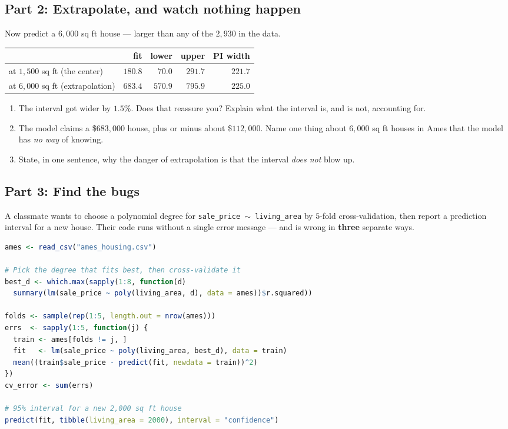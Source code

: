 \documentclass{article}
\begin{document}
\newpage

\subsection*{Part 2: Extrapolate, and watch nothing happen}

Now predict a $6{,}000$ sq ft house --- larger than any of the $2{,}930$ in the data.

\begin{center}
\renewcommand{\arraystretch}{1.3}
\begin{tabular}{lrrrr}
\toprule
& fit & lower & upper & PI width \\
\midrule
at $1{,}500$ sq ft (the center) & $180.8$ & $70.0$ & $291.7$ & $221.7$ \\
at $6{,}000$ sq ft (extrapolation) & $683.4$ & $570.9$ & $795.9$ & $225.0$ \\
\bottomrule
\end{tabular}
\end{center}

\begin{enumerate}[label={\bfseries (\Alph*)},itemsep=.8em]
\item The interval got wider by $1.5\%$. Does that reassure you? Explain what the interval is, and is not, accounting for. \\[4em]
\item The model claims a \$$683{,}000$ house, plus or minus about \$$112{,}000$. Name one thing about $6{,}000$ sq ft houses in Ames that the model has \emph{no way} of knowing. \\[3.5em]
\item State, in one sentence, why the danger of extrapolation is that the interval \emph{does not} blow up. \\[3.5em]
\end{enumerate}

\subsection*{Part 3: Find the bugs}

A classmate wants to choose a polynomial degree for \texttt{sale\_price $\sim$ living\_area} by $5$-fold cross-validation, then report a prediction interval for a new house. Their code runs without a single error message --- and is wrong in \textbf{three} separate ways.

\begin{lstlisting}[language=R]
ames <- read_csv("ames_housing.csv")

# Pick the degree that fits best, then cross-validate it
best_d <- which.max(sapply(1:8, function(d)
  summary(lm(sale_price ~ poly(living_area, d), data = ames))$r.squared))

folds <- sample(rep(1:5, length.out = nrow(ames)))
errs  <- sapply(1:5, function(j) {
  train <- ames[folds != j, ]
  fit   <- lm(sale_price ~ poly(living_area, best_d), data = train)
  mean((train$sale_price - predict(fit, newdata = train))^2)
})
cv_error <- sum(errs)

# 95% interval for a new 2,000 sq ft house
predict(fit, tibble(living_area = 2000), interval = "confidence")
\end{lstlisting}
\end{document}
